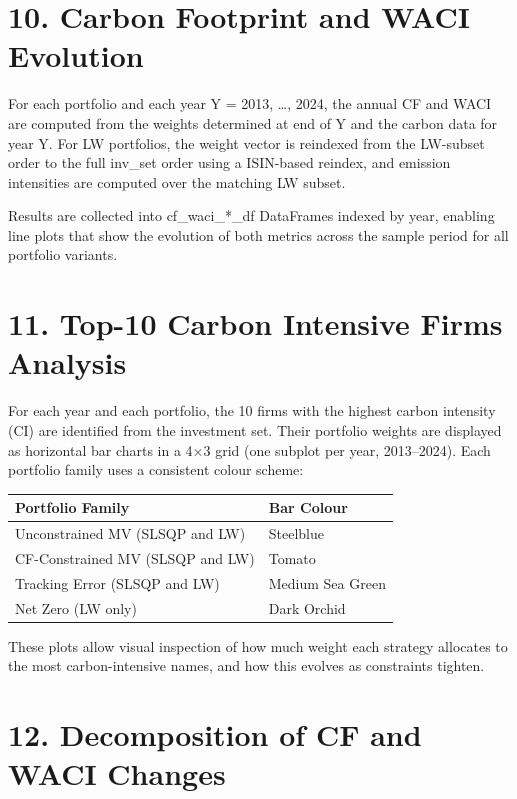 \documentclass[
  11pt,
]{article}
\begin{document}
\hypertarget{carbon-footprint-and-waci-evolution}{%
\section{10. Carbon Footprint and WACI
Evolution}\label{carbon-footprint-and-waci-evolution}}

For each portfolio and each year Y = 2013, \ldots, 2024, the annual CF
and WACI are computed from the weights determined at end of Y and the
carbon data for year Y. For LW portfolios, the weight vector is
reindexed from the LW-subset order to the full inv\_set order using a
ISIN-based reindex, and emission intensities are computed over the
matching LW subset.

Results are collected into cf\_waci\_*\_df DataFrames indexed by year,
enabling line plots that show the evolution of both metrics across the
sample period for all portfolio variants.

\hypertarget{top-10-carbon-intensive-firms-analysis}{%
\section{11. Top-10 Carbon Intensive Firms
Analysis}\label{top-10-carbon-intensive-firms-analysis}}

For each year and each portfolio, the 10 firms with the highest carbon
intensity (CI) are identified from the investment set. Their portfolio
weights are displayed as horizontal bar charts in a 4×3 grid (one
subplot per year, 2013--2024). Each portfolio family uses a consistent
colour scheme:

\begin{longtable}[]{@{}ll@{}}
\toprule
\textbf{Portfolio Family} & \textbf{Bar Colour}\tabularnewline
\midrule
\endhead
Unconstrained MV (SLSQP and LW) & Steelblue\tabularnewline
CF-Constrained MV (SLSQP and LW) & Tomato\tabularnewline
Tracking Error (SLSQP and LW) & Medium Sea Green\tabularnewline
Net Zero (LW only) & Dark Orchid\tabularnewline
\bottomrule
\end{longtable}

These plots allow visual inspection of how much weight each strategy
allocates to the most carbon-intensive names, and how this evolves as
constraints tighten.

\hypertarget{decomposition-of-cf-and-waci-changes}{%
\section{12. Decomposition of CF and WACI
Changes}\label{decomposition-of-cf-and-waci-changes}}
\end{document}
